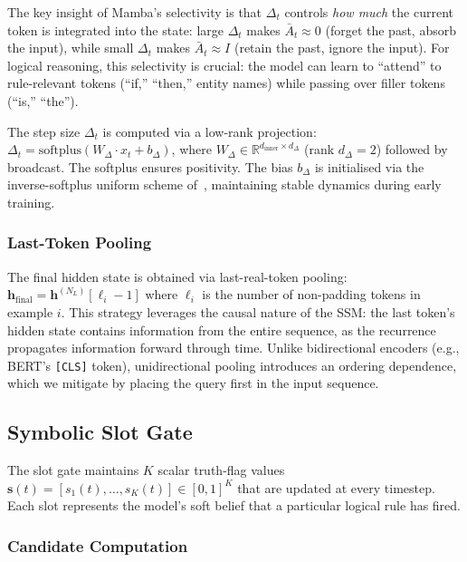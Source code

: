 \documentclass[conference]{IEEEtran}
\newcommand{\Real}{\mathbb{R}}
\begin{document}
The key insight of Mamba's selectivity is that $\Delta_t$ controls
\emph{how much} the current token is integrated into the state:
large $\Delta_t$ makes $\bar{A}_t \approx 0$ (forget the past,
absorb the input), while small $\Delta_t$ makes $\bar{A}_t
\approx I$ (retain the past, ignore the input).  For logical
reasoning, this selectivity is crucial: the model can learn to
``attend'' to rule-relevant tokens (``if,'' ``then,'' entity names)
while passing over filler tokens (``is,'' ``the'').

The step size $\Delta_t$ is computed via a low-rank projection:
$\Delta_t = \mathrm{softplus}(W_{\Delta} \cdot x_t + b_\Delta)$,
where $W_\Delta \in \Real^{d_{\text{inner}} \times d_\Delta}$
(rank $d_\Delta = 2$) followed by broadcast.  The softplus
ensures positivity.  The bias $b_\Delta$ is initialised via the
inverse-softplus uniform scheme of~\cite{gu2023mamba}, maintaining
stable dynamics during early training.

\subsubsection{Last-Token Pooling}

The final hidden state is obtained via last-real-token pooling:
$\mathbf{h}_{\text{final}} = \mathbf{h}^{(N_L)}[\ell_i - 1]$
where $\ell_i$ is the number of non-padding tokens in example $i$.
This strategy leverages the causal nature of the SSM: the last
token's hidden state contains information from the entire sequence,
as the recurrence propagates information forward through time.
Unlike bidirectional encoders (e.g., BERT's \texttt{[CLS]} token),
unidirectional pooling introduces an ordering dependence, which
we mitigate by placing the query first in the input sequence.

\subsection{Symbolic Slot Gate}
\label{sec:slotgate}

The slot gate maintains $K$ scalar truth-flag values
$\mathbf{s}(t) = [s_1(t), \dots, s_K(t)] \in [0,1]^K$ that are
updated at every timestep.  Each slot represents the model's
soft belief that a particular logical rule has fired.

\subsubsection{Candidate Computation}
\end{document}
